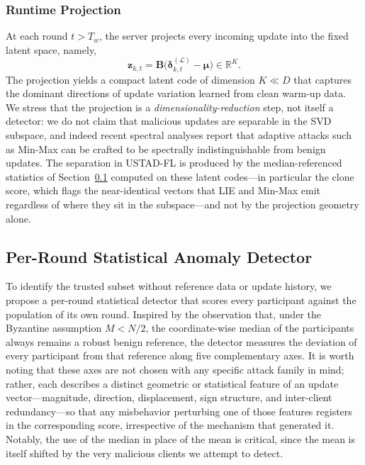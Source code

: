 \documentclass[journal]{IEEEtran}
\begin{document}
\subsubsection{Runtime Projection}
At each round $t > T_w$, the server projects every incoming update into the fixed latent space, namely,
\begin{equation}
\mathbf{z}_{k,t} = \mathbf{B}\bigl(\boldsymbol{\delta}_{k,t}^{(\mathcal{L})} - \boldsymbol{\mu}\bigr) \in \mathbb{R}^K.
\label{eq:projection}
\end{equation}
The projection yields a compact latent code of dimension $K \ll D$ that captures the dominant directions of update variation learned from clean warm-up data. We stress that the projection is a \emph{dimensionality-reduction} step, not itself a detector: we do not claim that malicious updates are separable in the SVD subspace, and indeed recent spectral analyses report that adaptive attacks such as Min-Max can be crafted to be spectrally indistinguishable from benign updates. The separation in USTAD-FL is produced by the median-referenced statistics of Section~\ref{sec:stat_detector} computed on these latent codes---in particular the clone score, which flags the near-identical vectors that LIE and Min-Max emit regardless of where they sit in the subspace---and not by the projection geometry alone.

\subsection{Per-Round Statistical Anomaly Detector}
\label{sec:stat_detector}

To identify the trusted subset without reference data or update history, we propose a per-round statistical detector that scores every participant against the population of its own round. Inspired by the observation that, under the Byzantine assumption $M < N/2$, the coordinate-wise median of the participants always remains a robust benign reference, the detector measures the deviation of every participant from that reference along five complementary axes. It is worth noting that these axes are not chosen with any specific attack family in mind; rather, each describes a distinct geometric or statistical feature of an update vector---magnitude, direction, displacement, sign structure, and inter-client redundancy---so that any misbehavior perturbing one of those features registers in the corresponding score, irrespective of the mechanism that generated it. Notably, the use of the median in place of the mean is critical, since the mean is itself shifted by the very malicious clients we attempt to detect.
\end{document}
